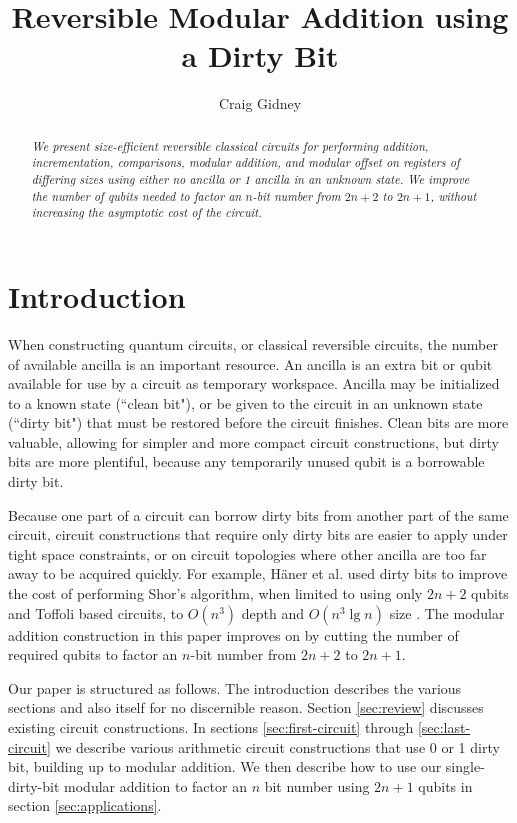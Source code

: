 \documentclass[twocolumn]{article}
\title{Reversible Modular Addition using a Dirty Bit}
\author{Craig Gidney}
\begin{document}
\maketitle

\begin{abstract}
\em
We present size-efficient reversible classical circuits for performing addition, incrementation, comparisons, modular addition, and modular offset on registers of differing sizes using either no ancilla or 1 ancilla in an unknown state.
We improve the number of qubits needed to factor an $n$-bit number from $2n+2$ \cite{takahashi2006, haner2016} to $2n+1$, without increasing the asymptotic cost of the circuit.
\end{abstract}

\section{Introduction}

When constructing quantum circuits, or classical reversible circuits, the number of available ancilla is an important resource.
An ancilla is an extra bit or qubit available for use by a circuit as temporary workspace.
Ancilla may be initialized to a known state (``clean bit"), or be given to the circuit in an unknown state (``dirty bit") that must be restored before the circuit finishes.
Clean bits are more valuable, allowing for simpler and more compact circuit constructions, but dirty bits are more plentiful, because any temporarily unused qubit is a borrowable dirty bit.

Because one part of a circuit can borrow dirty bits from another part of the same circuit, circuit constructions that require only dirty bits are easier to apply under tight space constraints, or on circuit topologies where other ancilla are too far away to be acquired quickly.
For example, H\"{a}ner et al. used dirty bits to improve the cost of performing Shor's algorithm, when limited to using only $2n+2$ qubits and Toffoli based circuits, to $O(n^3)$ depth and $O(n^3 \lg n)$ size \cite{haner2016}.
The modular addition construction in this paper improves on \cite{haner2016} by cutting the number of required qubits to factor an $n$-bit number from $2n+2$ to $2n+1$.

Our paper is structured as follows.
The introduction describes the various sections and also itself for no discernible reason.
Section \ref{sec:review} discusses existing circuit constructions.
In sections \ref{sec:first-circuit} through \ref{sec:last-circuit} we describe various arithmetic circuit constructions that use 0 or 1 dirty bit, building up to modular addition.
We then describe how to use our single-dirty-bit modular addition to factor an $n$ bit number using $2n+1$ qubits in section \ref{sec:applications}.
\end{document}
